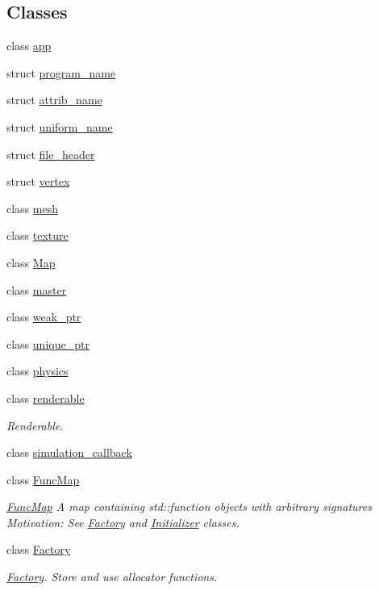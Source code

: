 \subsection*{\-Classes}
\begin{DoxyCompactItemize}
\item 
class \hyperlink{classNeb_1_1app}{app}
\item 
struct \hyperlink{structNeb_1_1program__name}{program\-\_\-name}
\item 
struct \hyperlink{structNeb_1_1attrib__name}{attrib\-\_\-name}
\item 
struct \hyperlink{structNeb_1_1uniform__name}{uniform\-\_\-name}
\item 
struct \hyperlink{structNeb_1_1file__header}{file\-\_\-header}
\item 
struct \hyperlink{structNeb_1_1vertex}{vertex}
\item 
class \hyperlink{classNeb_1_1mesh}{mesh}
\item 
class \hyperlink{classNeb_1_1texture}{texture}
\item 
class \hyperlink{classNeb_1_1Map}{\-Map}
\item 
class \hyperlink{classNeb_1_1master}{master}
\item 
class \hyperlink{classNeb_1_1weak__ptr}{weak\-\_\-ptr}
\item 
class \hyperlink{classNeb_1_1unique__ptr}{unique\-\_\-ptr}
\item 
class \hyperlink{classNeb_1_1physics}{physics}
\item 
class \hyperlink{classNeb_1_1renderable}{renderable}
\begin{DoxyCompactList}\small\item\em \-Renderable. \end{DoxyCompactList}\item 
class \hyperlink{classNeb_1_1simulation__callback}{simulation\-\_\-callback}
\item 
class \hyperlink{classNeb_1_1FuncMap}{\-Func\-Map}
\begin{DoxyCompactList}\small\item\em \hyperlink{classNeb_1_1FuncMap}{\-Func\-Map} \-A map containing {\ttfamily std\-::function} objects with arbitrary signatures \-Motivation\-: \-See \hyperlink{classNeb_1_1Factory}{\-Factory} and \hyperlink{classNeb_1_1Initializer}{\-Initializer} classes. \end{DoxyCompactList}\item 
class \hyperlink{classNeb_1_1Factory}{\-Factory}
\begin{DoxyCompactList}\small\item\em \hyperlink{classNeb_1_1Factory}{\-Factory}. \-Store and use allocator functions. \end{DoxyCompactList}\item 

\end{DoxyCompactItemize}
